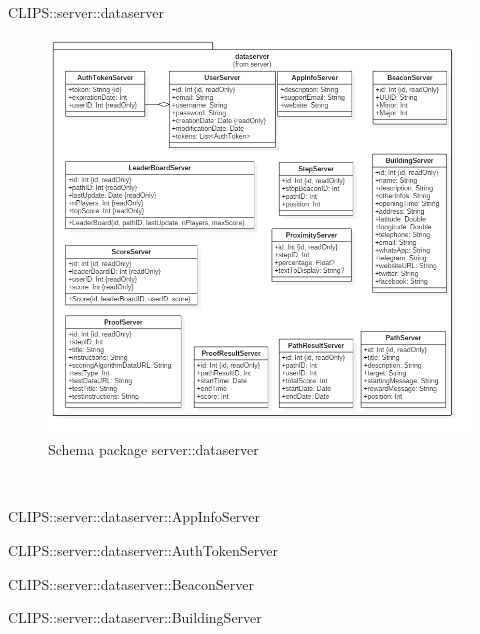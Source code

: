 \begin{componente}{CLIPS::server::dataserver}
\begin{figure}[h!]
\centering
\includegraphics[scale=0.4]{img/package/png/server--data.png}
\caption{Schema package server::dataserver}
 \end{figure}
\begin{compClassi} \\
\begin{classe}{CLIPS::server::dataserver::AppInfoServer}
\end{classe}\begin{classe}{CLIPS::server::dataserver::AuthTokenServer}
\end{classe}\begin{classe}{CLIPS::server::dataserver::BeaconServer}
\end{classe}\begin{classe}{CLIPS::server::dataserver::BuildingServer}

\end{classe}
\end{compClassi}
\end{componente}
